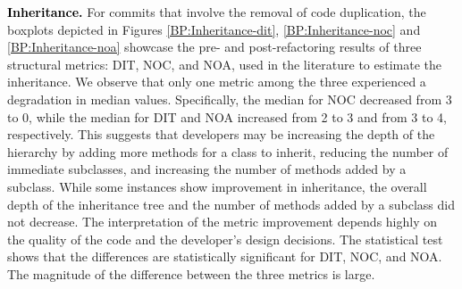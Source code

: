 
\noindent\textbf{\textcolor{black}{Inheritance.}} For commits that involve the removal of code duplication, the boxplots depicted in Figures  \ref{BP:Inheritance-dit}, \ref{BP:Inheritance-noc} and \ref{BP:Inheritance-noa} showcase the pre- and post-refactoring results of three structural metrics:  \ie DIT, NOC, and NOA, used in the literature to estimate the inheritance. We observe that only one metric among the three experienced a degradation in median values. Specifically, the median for NOC decreased from 3 to 0, while the median for DIT and NOA increased from 2 to 3 and from 3 to 4, respectively. This suggests that developers may be increasing the depth of the hierarchy by adding more methods for a class to inherit, reducing the number of immediate subclasses, and increasing the number of methods added by a subclass. While some instances show improvement in inheritance, the overall depth of the inheritance tree and the number of methods added by a subclass did not decrease.  The interpretation of the metric improvement depends highly on the quality of the code and the developer's design decisions. The statistical test shows that the differences are statistically significant for DIT, NOC, and NOA. The magnitude of the difference between the three metrics is large.

